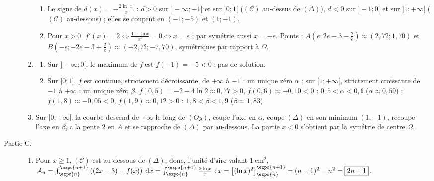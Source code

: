 \begin{corrige}
\begin{sol}
\begin{description}
\begin{enumerate}
\begin{enumerate}
            \item Le signe de $d(x) = -\frac{2\ln|x|}{x}$ : $d > 0$ sur $]-\infty ; -1[$ et sur $]0 ; 1[$ ($(\mathscr{C})$ au-dessus de $(\Delta)$),
                  $d < 0$ sur $]-1 ; 0[$ et sur $]1 ; +\infty[$ ($(\mathscr{C})$ au-dessous) ; elles se coupent en $(-1 ; -5)$ et $(1 ; -1)$.
            \item Pour $x > 0$, $f'(x) = 2 \iff \frac{1 - \ln x}{x^2} = 0 \iff x = e$ ; par sym\'etrie aussi $x = -e$.
                  Points : $\boxed{A\left( e ; 2e - 3 - \frac{2}{e} \right) \approx (2{,}72 ; 1{,}70)}$ et
                  $\boxed{B\left( -e ; -2e - 3 + \frac{2}{e} \right) \approx (-2{,}72 ; -7{,}70)}$, sym\'etriques par rapport \`a $\Omega$.
            \end{enumerate}
      \item \begin{enumerate}
            \item Sur $]-\infty ; 0[$, le maximum de $f$ est $f(-1) = -5 < 0$ : pas de solution.
            \item Sur $]0 ; 1]$, $f$ est continue, strictement d\'ecroissante, de $+\infty$ \`a $-1$ : un unique z\'ero $\alpha$ ;
                  sur $[1 ; +\infty[$, strictement croissante de $-1$ \`a $+\infty$ : un unique z\'ero $\beta$.
                  $f(0{,}5) = -2 + 4\ln 2 \approx 0{,}77 > 0$, $f(0{,}6) \approx -0{,}10 < 0$ : $0{,}5 < \alpha < 0{,}6$ ($\alpha \approx 0{,}59$) ;
                  $f(1{,}8) \approx -0{,}05 < 0$, $f(1{,}9) \approx 0{,}12 > 0$ : $1{,}8 < \beta < 1{,}9$ ($\beta \approx 1{,}83$).
            \end{enumerate}
      \item Sur $]0 ; +\infty[$, la courbe descend de $+\infty$ le long de $(Oy)$, coupe l'axe en $\alpha$, coupe $(\Delta)$ en son minimum
            $(1 ; -1)$, recoupe l'axe en $\beta$, a la pente $2$ en $A$ et se rapproche de $(\Delta)$ par au-dessous. La partie
            $x < 0$ s'obtient par la sym\'etrie de centre $\Omega$.
      \end{enumerate}
\item[Partie C.] \begin{enumerate}
      \item Pour $x \geq 1$, $(\mathscr{C})$ est au-dessous de $(\Delta)$, donc, l'unit\'e d'aire valant $1~\text{cm}^2$,
            $\mathcal{A}_n = \int_{\expo{n}}^{\expo{n+1}} \left( (2x - 3) - f(x) \right)\dx = \int_{\expo{n}}^{\expo{n+1}} \frac{2\ln x}{x}\dx
            = \left[ (\ln x)^2 \right]_{\expo{n}}^{\expo{n+1}} = (n+1)^2 - n^2 = \boxed{2n + 1}$.

\end{enumerate}
\end{description}
\end{sol}
\end{corrige}
